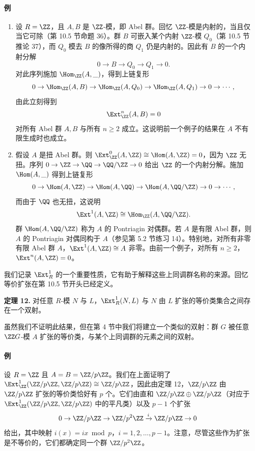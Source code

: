 \paragraph{例}
\begin{enumerate}[label=(\arabic*)]
  \item 设 $R=\ZZ$，且 $A,B$ 是 $\ZZ$-模，即 Abel 群。回忆 $\ZZ$-模是内射的，当且仅当它可除（第 10.5 节命题 36）。群 $B$ 可嵌入某个内射 $\ZZ$-模 $Q_0$（第 10.5 节推论 37），而 $Q_0$ 模去 $B$ 的像所得的商 $Q_1$ 仍是内射的。因此有 $B$ 的一个内射分解
  \[
    0\to B\to Q_0\to Q_1\to0.
  \]
  对此序列施加 $\Hom_{\ZZ}(A,\_)$，得到上链复形
  \[
    0\to\Hom_{\ZZ}(A,B)\to\Hom_{\ZZ}(A,Q_0)\to\Hom_{\ZZ}(A,Q_1)\to0\to\cdots,
  \]
  由此立刻得到
  \[
    \Ext_{\ZZ}^n(A,B)=0
  \]
  对所有 Abel 群 $A,B$ 与所有 $n\geq2$ 成立。这说明前一个例子的结果在 $A$ 不有限生成时也成立。

  \item 假设 $A$ 是扭 Abel 群。则 $\Ext_{\ZZ}^0(A,\ZZ)\cong\Hom(A,\ZZ)=0$，因为 $\ZZ$ 无扭。序列 $0\to\ZZ\to\QQ\to\QQ/\ZZ\to0$ 给出 $\ZZ$ 的一个内射分解。施加 $\Hom(A,\_)$ 得到上链复形
  \[
    0\to\Hom(A,\ZZ)\to\Hom(A,\QQ)\to\Hom(A,\QQ/\ZZ)\to0\to\cdots,
  \]
  而由于 $\QQ$ 也无扭，这说明
  \[
    \Ext^1(A,\ZZ)\cong\Hom_{\ZZ}(A,\QQ/\ZZ).
  \]
  群 $\Hom(A,\QQ/\ZZ)$ 称为 $A$ 的 Pontriagin 对偶群。若 $A$ 是有限 Abel 群，则 $A$ 的 Pontriagin 对偶同构于 $A$（参见第 5.2 节练习 14）。特别地，对所有非零有限 Abel 群 $A$，$\Ext^1(A,\ZZ)\cong A$ 非零。由前一个例子，对所有 $n\geq2$，$\Ext^n(A,\ZZ)=0$。
\end{enumerate}

我们记录 $\Ext_R^1$ 的一个重要性质，它有助于解释这些上同调群名称的来源。回忆等价扩张在第 10.5 节开头已经定义。

\medskip
\noindent\textbf{定理 12.} 对任意 $R$-模 $N$ 与 $L$，$\Ext_R^1(N,L)$ 与 $N$ 由 $L$ 扩张的等价类集合之间存在一个双射。

虽然我们不证明此结果，但在第 4 节中我们将建立一个类似的双射：群 $G$ 被任意 $\ZZ G$-模 $A$ 扩张的等价类，与某个上同调群的元素之间的双射。

\paragraph{例}
设 $R=\ZZ$ 且 $A=B=\ZZ/p\ZZ$。我们在上面证明了 $\Ext_{\ZZ}^1(\ZZ/p\ZZ,\ZZ/p\ZZ)\cong\ZZ/p\ZZ$，因此由定理 12，$\ZZ/p\ZZ$ 由 $\ZZ/p\ZZ$ 扩张的等价类恰好有 $p$ 个。它们由直和 $\ZZ/p\ZZ\oplus\ZZ/p\ZZ$（对应于 $\Ext_{\ZZ}^1(\ZZ/p\ZZ,\ZZ/p\ZZ)$ 中的平凡类）以及 $p-1$ 个扩张
\[
  0\to\ZZ/p\ZZ\to\ZZ/p^2\ZZ\xrightarrow{i}\ZZ/p\ZZ\to0
\]
给出，其中映射 $i(x)=ix\bmod p$，$i=1,2,\ldots,p-1$。注意，尽管这些作为扩张是不等价的，它们都确定同一个群 $\ZZ/p^2\ZZ$。

